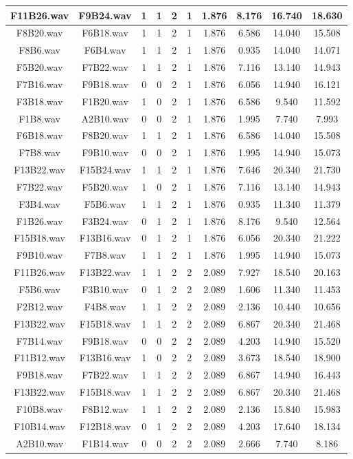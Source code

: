 \documentclass[11pt,a4paper,twoside]{book}
\begin{document}
\begin{longtable}[c]{|c|c|c|c|c|c|c|c|c|c|}
F11B26.wav&F9B24.wav&1&1&2&1&1.876&8.176&16.740&18.630\\ \hline
F8B20.wav&F6B18.wav&1&1&2&1&1.876&6.586&14.040&15.508\\ \hline
F8B6.wav&F6B4.wav&1&1&2&1&1.876&0.935&14.040&14.071\\ \hline
F5B20.wav&F7B22.wav&1&1&2&1&1.876&7.116&13.140&14.943\\ \hline
F7B16.wav&F9B18.wav&0&0&2&1&1.876&6.056&14.940&16.121\\ \hline
F3B18.wav&F1B20.wav&1&0&2&1&1.876&6.586&9.540&11.592\\ \hline
F1B8.wav&A2B10.wav&0&0&2&1&1.876&1.995&7.740&7.993\\ \hline
F6B18.wav&F8B20.wav&1&1&2&1&1.876&6.586&14.040&15.508\\ \hline
F7B8.wav&F9B10.wav&0&0&2&1&1.876&1.995&14.940&15.073\\ \hline
F13B22.wav&F15B24.wav&1&1&2&1&1.876&7.646&20.340&21.730\\ \hline
F7B22.wav&F5B20.wav&1&0&2&1&1.876&7.116&13.140&14.943\\ \hline
F3B4.wav&F5B6.wav&1&1&2&1&1.876&0.935&11.340&11.379\\ \hline
F1B26.wav&F3B24.wav&0&1&2&1&1.876&8.176&9.540&12.564\\ \hline
F15B18.wav&F13B16.wav&0&1&2&1&1.876&6.056&20.340&21.222\\ \hline
F9B10.wav&F7B8.wav&1&1&2&1&1.876&1.995&14.940&15.073\\ \hline
F11B26.wav&F13B22.wav&1&1&2&2&2.089&7.927&18.540&20.163\\ \hline
F5B6.wav&F3B10.wav&0&1&2&2&2.089&1.606&11.340&11.453\\ \hline
F2B12.wav&F4B8.wav&1&1&2&2&2.089&2.136&10.440&10.656\\ \hline
F13B22.wav&F15B18.wav&1&1&2&2&2.089&6.867&20.340&21.468\\ \hline
F7B14.wav&F9B18.wav&0&0&2&2&2.089&4.203&14.940&15.520\\ \hline
F11B12.wav&F13B16.wav&1&0&2&2&2.089&3.673&18.540&18.900\\ \hline
F9B18.wav&F7B22.wav&1&1&2&2&2.089&6.867&14.940&16.443\\ \hline
F13B22.wav&F15B18.wav&1&1&2&2&2.089&6.867&20.340&21.468\\ \hline
F10B8.wav&F8B12.wav&1&1&2&2&2.089&2.136&15.840&15.983\\ \hline
F10B14.wav&F12B18.wav&0&1&2&2&2.089&4.203&17.640&18.134\\ \hline
A2B10.wav&F1B14.wav&0&0&2&2&2.089&2.666&7.740&8.186\\ \hline

\end{longtable}
\end{document}
